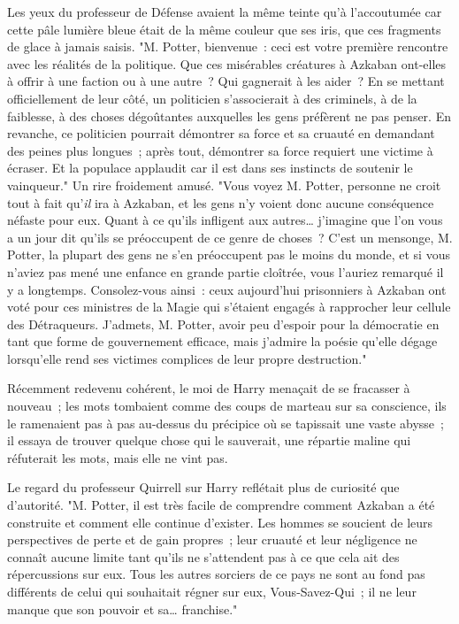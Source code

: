 Les yeux du professeur de Défense avaient la même teinte qu'à l'accoutumée car cette pâle lumière bleue était de la même couleur que ses iris, que ces fragments de glace à jamais saisis. "M. Potter, bienvenue~: ceci est votre première rencontre avec les réalités de la politique. Que ces misérables créatures à Azkaban ont-elles à offrir à une faction ou à une autre~? Qui gagnerait à les aider~? En se mettant officiellement de leur côté, un politicien s'associerait à des criminels, à de la faiblesse, à des choses dégoûtantes auxquelles les gens préfèrent ne pas penser. En revanche, ce politicien pourrait démontrer sa force et sa cruauté en demandant des peines plus longues~; après tout, démontrer sa force requiert une victime à écraser. Et la populace applaudit car il est dans ses instincts de soutenir le vainqueur." Un rire froidement amusé. "Vous voyez M. Potter, personne ne croit tout à fait qu'\emph{il} ira à Azkaban, et les gens n'y voient donc aucune conséquence néfaste pour eux. Quant à ce qu'ils infligent aux autres… j'imagine que l'on vous a un jour dit qu'ils se préoccupent de ce genre de choses~? C'est un mensonge, M. Potter, la plupart des gens ne s'en préoccupent pas le moins du monde, et si vous n'aviez pas mené une enfance en grande partie cloîtrée, vous l'auriez remarqué il y a longtemps. Consolez-vous ainsi~: ceux aujourd'hui prisonniers à Azkaban ont voté pour ces ministres de la Magie qui s'étaient engagés à rapprocher leur cellule des Détraqueurs. J'admets, M. Potter, avoir peu d'espoir pour la démocratie en tant que forme de gouvernement efficace, mais j'admire la poésie qu'elle dégage lorsqu'elle rend ses victimes complices de leur propre destruction."

Récemment redevenu cohérent, le moi de Harry menaçait de se fracasser à nouveau~; les mots tombaient comme des coups de marteau sur sa conscience, ils le ramenaient pas à pas au-dessus du précipice où se tapissait une vaste abysse~; il essaya de trouver quelque chose qui le sauverait, une répartie maline qui réfuterait les mots, mais elle ne vint pas.

Le regard du professeur Quirrell sur Harry reflétait plus de curiosité que d'autorité. "M. Potter, il est très facile de comprendre comment Azkaban a été construite et comment elle continue d'exister. Les hommes se soucient de leurs perspectives de perte et de gain propres~; leur cruauté et leur négligence ne connaît aucune limite tant qu'ils ne s'attendent pas à ce que cela ait des répercussions sur eux. Tous les autres sorciers de ce pays ne sont au fond pas différents de celui qui souhaitait régner sur eux, Vous-Savez-Qui~; il ne leur manque que son pouvoir et sa… franchise."

